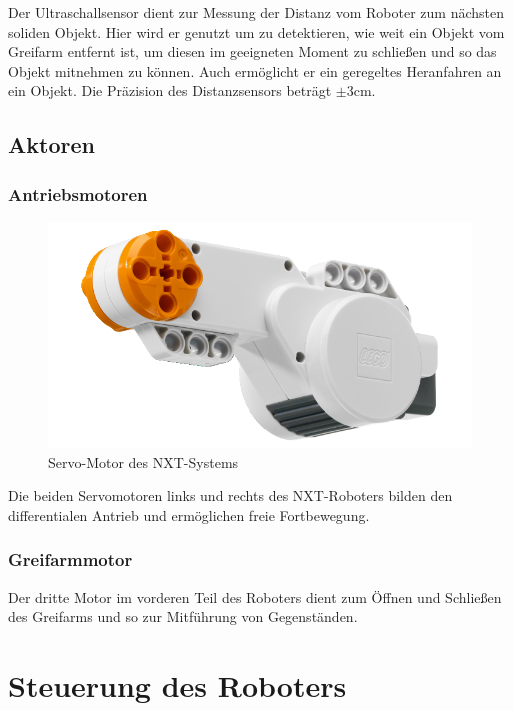 Der Ultraschallsensor dient zur Messung der Distanz vom Roboter zum nächsten soliden Objekt. Hier wird er genutzt um zu detektieren, wie weit ein Objekt vom Greifarm entfernt ist, um diesen im geeigneten Moment zu schließen und so das Objekt mitnehmen zu können. Auch ermöglicht er ein geregeltes Heranfahren an ein Objekt. Die Präzision des Distanzsensors beträgt $\pm$3cm.

\subsection{Aktoren}

\subsubsection{Antriebsmotoren}

\begin{figure}[h]
\centering
\includegraphics[width=\textwidth/3]{Bilder/Robot/motor}
\caption{Servo-Motor des NXT-Systems}
\label{fig:motor}
\end{figure}

Die beiden Servomotoren links und rechts des NXT-Roboters bilden den differentialen Antrieb und ermöglichen freie Fortbewegung.

\subsubsection{Greifarmmotor}
\label{greifarm}
Der dritte Motor im vorderen Teil des Roboters dient zum Öffnen und Schließen des Greifarms und so zur Mitführung von Gegenständen.

\section{Steuerung des Roboters}

